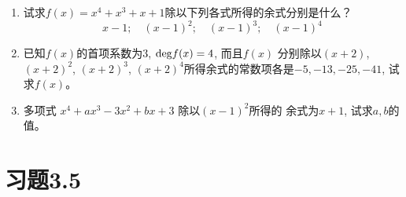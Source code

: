 \begin{ex}
\begin{enumerate}
    \item 试求$f(x)=x^4+x^3+x+1$除以下列各式所得的余式分别是什么？
\[x-1;\quad  (x-1)^2;\quad (x-1)^3;\quad (x-1)^4\]
\item 已知$f(x)$的首项系数为3, ${\rm deg}f(x)=4$, 而且$f(x)$
分别除以$(x+2)$, $(x+2)^2$, $(x+2)^3$, $(x+2)^4$所得余式的常数项各是$-5,-13,-25,-41$, 试求$f(x)$。
\item 多项式 $x^4+ax^3-3x^2+bx+3$ 除以$(x-1)^2$所得的
余式为$x+1$, 试求$a,b$的值。
\end{enumerate}
\end{ex}


\section*{习题3.5}
